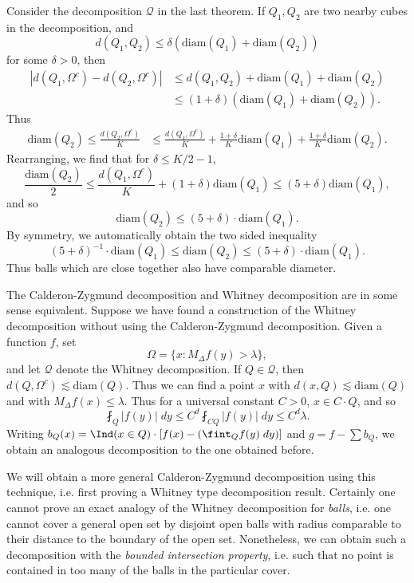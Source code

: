 \begin{remark}
    Consider the decomposition $\mathcal{Q}$ in the last theorem. If $Q_1,Q_2$ are two nearby cubes in the decomposition, and
    \[ d(Q_1,Q_2) \leq \delta ( \text{diam}(Q_1) + \text{diam}(Q_2)) \]
    for some $\delta > 0$, then
    \begin{align*}
        | d(Q_1,\Omega^c) - d(Q_2,\Omega^c) | &\leq d(Q_1,Q_2) + \text{diam}(Q_1) + \text{diam}(Q_2)\\
        &\leq (1 + \delta) (\text{diam}(Q_1) + \text{diam}(Q_2)).
    \end{align*}
    Thus
    \begin{align*}
        \text{diam}(Q_2) \leq \frac{d(Q_2,\Omega^c)}{K} &\leq \frac{d(Q_1,\Omega^c)}{K} + \frac{1 + \delta}{K} \text{diam}(Q_1) + \frac{1 + \delta}{K} \text{diam}(Q_2).
    \end{align*}
    Rearranging, we find that for $\delta \leq K/2 - 1$,
    \[ \frac{\text{diam}(Q_2)}{2} \leq \frac{d(Q_1,\Omega^c)}{K} + (1 + \delta) \text{diam}(Q_1) \leq (5 + \delta) \text{diam}(Q_1), \]
    and so
    \[ \text{diam}(Q_2) \leq (5 + \delta) \cdot \text{diam}(Q_1). \]
    By symmetry, we automatically obtain the two sided inequality
    \[ (5 + \delta)^{-1} \cdot \text{diam}(Q_1) \leq \text{diam}(Q_2) \leq (5 + \delta) \cdot \text{diam}(Q_1). \]
    Thus balls which are close together also have comparable diameter.
\end{remark}

The Calderon-Zygmund decomposition and Whitney decomposition are in some sense equivalent. Suppose we have found a construction of the Whitney decomposition without using the Calderon-Zygmund decomposition. Given a function $f$, set
%
\[ \Omega = \{ x : M_\Delta f(y) > \lambda \}, \]
%
and let $\mathcal{Q}$ denote the Whitney decomposition. If $Q \in \mathcal{Q}$, then $d(Q,\Omega^c) \lesssim \text{diam}(Q)$. Thus we can find a point $x$ with $d(x,Q) \lesssim \text{diam}(Q)$ and with $M_\Delta f(x) \leq \lambda$. Thus for a universal constant $C > 0$, $x \in C \cdot Q$, and so
%
\[ \fint_Q |f(y)|\; dy \leq C^d \fint_{CQ} |f(y)|\; dy \leq C^d \lambda. \]
%
Writing $b_Q(x) = \Ind(x \in Q) \cdot [f(x) - (\fint_Q f(y)\; dy)]$ and $g = f - \sum b_Q$, we obtain an analogous decomposition to the one obtained before.

We will obtain a more general Calderon-Zygmund decomposition using this technique, i.e. first proving a Whitney type decomposition result. Certainly one cannot prove an exact analogy of the Whitney decomposition for \emph{balls}, i.e. one cannot cover a general open set by disjoint open balls with radius comparable to their distance to the boundary of the open set. Nonetheless, we can obtain such a decomposition with the \emph{bounded intersection property}, i.e. such that no point is contained in too many of the balls in the particular cover.

